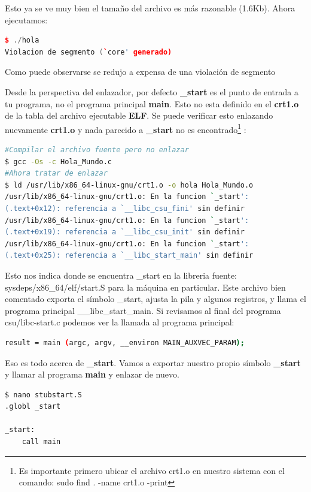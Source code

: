 \documentclass[12pt, twoside]{report}
\begin{document}
Esto ya se ve muy bien el tamaño del archivo es más razonable (1.6Kb). Ahora ejecutamos:

\begin{lstlisting}[language=C++]
$ ./hola
Violacion de segmento (`core' generado)
\end{lstlisting}
 Como puede observarse se redujo a expensa de una violación de segmento

Desde la perspectiva del enlazador, por defecto \textbf{\_start} es el punto de entrada a tu programa, no el programa principal \textbf{main}. Esto no esta definido en el \textbf{crt1.o} de la tabla del archivo ejecutable \textbf{ELF}. Se puede verificar esto enlazando nuevamente \textbf{crt1.o} y nada parecido a \textbf{\_start} no es encontrado\footnote{Es importante primero ubicar el archivo crt1.o en nuestro sistema con el comando: sudo find . -name crt1.o -print } :

\begin{lstlisting}[language=bash]
#Compilar el archivo fuente pero no enlazar
$ gcc -Os -c Hola_Mundo.c
#Ahora tratar de enlazar
$ ld /usr/lib/x86_64-linux-gnu/crt1.o -o hola Hola_Mundo.o
/usr/lib/x86_64-linux-gnu/crt1.o: En la funcion `_start':
(.text+0x12): referencia a `__libc_csu_fini' sin definir
/usr/lib/x86_64-linux-gnu/crt1.o: En la funcion `_start':
(.text+0x19): referencia a `__libc_csu_init' sin definir
/usr/lib/x86_64-linux-gnu/crt1.o: En la funcion `_start':
(.text+0x25): referencia a `__libc_start_main' sin definir
\end{lstlisting}
 
Esto nos indica donde se encuentra \_start en la libreria fuente:  sysdeps/x86\_64/elf/start.S para la máquina en particular. Este archivo bien comentado exporta el símbolo \_start, ajusta la pila y algunos registros, y llama el programa principal \_\_libc\_start\_main. Si revisamos al final del programa  csu/libc-start.c podemos ver la llamada al programa principal:

\begin{lstlisting}[language=bash]
result = main (argc, argv, __environ MAIN_AUXVEC_PARAM);
\end{lstlisting}

Eso es todo acerca de \textbf{\_start}. Vamos a exportar nuestro propio símbolo \textbf{\_start} y llamar al programa \textbf{main} y enlazar de nuevo.

\begin{lstlisting}[language=bash]
$ nano stubstart.S
.globl _start

_start:
    call main
\end{lstlisting}
\end{document}
